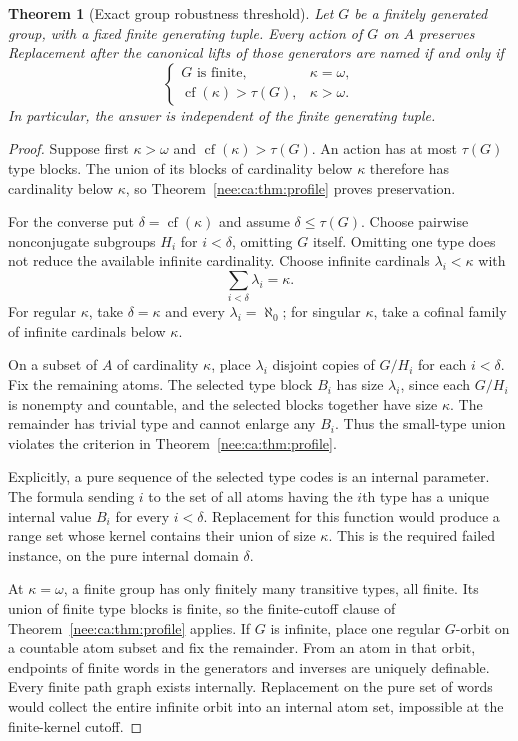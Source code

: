 \documentclass[11pt,letterpaper]{article}
\numberwithin{equation}{section}
\theoremstyle{plain}
\newtheorem{theorem}{Theorem}[section]
\theoremstyle{definition}
\theoremstyle{remark}
\newcommand{\cf}{\operatorname{cf}}
\begin{document}
\begin{theorem}[Exact group robustness threshold]\label{nee:ca:grp:robust}
Let $G$ be a finitely generated group, with a fixed finite generating
tuple.  Every action of $G$ on $A$ preserves Replacement after the canonical
lifts of those generators are named if and only if
\begin{equation}\label{nee:ca:grp:eq:robust}
 \begin{cases}
 G\text{ is finite},&\kappa=\omega,\\[2pt]
 \cf(\kappa)>\tau(G),&\kappa>\omega.
 \end{cases}
\end{equation}
In particular, the answer is independent of the finite generating tuple.
\end{theorem}
\begin{proof}
Suppose first $\kappa>\omega$ and $\cf(\kappa)>\tau(G)$.  An action has at
most $\tau(G)$ type blocks.  The union of its blocks of cardinality below
$\kappa$ therefore has cardinality below $\kappa$, so
Theorem~\ref{nee:ca:thm:profile} proves preservation.

For the converse put $\delta=\cf(\kappa)$ and assume
$\delta\leq\tau(G)$.  Choose pairwise nonconjugate subgroups $H_i$ for
$i<\delta$, omitting $G$ itself.  Omitting one type does not reduce the
available infinite cardinality.  Choose infinite cardinals
$\lambda_i<\kappa$ with
\[
 \sum_{i<\delta}\lambda_i=\kappa.
\]
For regular $\kappa$, take $\delta=\kappa$ and every
$\lambda_i=\aleph_0$; for singular $\kappa$, take a cofinal family of
infinite cardinals below $\kappa$.

On a subset of $A$ of cardinality $\kappa$, place $\lambda_i$ disjoint
copies of $G/H_i$ for each $i<\delta$.  Fix the remaining atoms.  The
selected type block $B_i$ has size $\lambda_i$, since each $G/H_i$ is
nonempty and countable, and the selected blocks together have size
$\kappa$.  The remainder has trivial type and cannot enlarge any $B_i$.
Thus the small-type union violates the criterion in
Theorem~\ref{nee:ca:thm:profile}.

Explicitly, a pure sequence of the selected type codes is an internal
parameter.  The formula sending $i$ to the set of all atoms having the
$i$th type has a unique internal value $B_i$ for every $i<\delta$.
Replacement for this function would produce a range set whose kernel
contains their union of size $\kappa$.  This is the required failed
instance, on the pure internal domain $\delta$.

At $\kappa=\omega$, a finite group has only finitely many transitive
types, all finite.  Its union of finite type blocks is finite, so the
finite-cutoff clause of Theorem~\ref{nee:ca:thm:profile} applies.  If $G$ is
infinite, place one regular $G$-orbit on a countable atom subset and fix
the remainder.  From an atom in that orbit, endpoints of finite words in
the generators and inverses are uniquely definable.  Every finite path
graph exists internally.  Replacement on the pure set of words would
collect the entire infinite orbit into an internal atom set, impossible
at the finite-kernel cutoff.
\end{proof}
\end{document}
